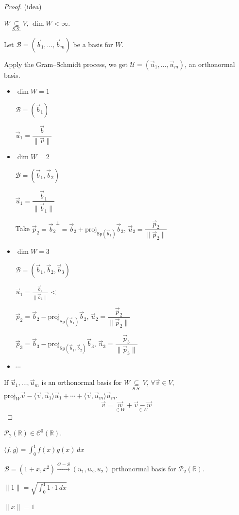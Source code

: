 \documentclass[11pt,fleqn]{book} %
\begin{document}
\begin{proof}
    (idea)

    $W \underset{S.S.}{\subseteq} V$, $\dim W < \infty$.

    Let $\mathcal{B} = (\vec{b}_1, \dots, \vec{b}_m)$ be a basis for $W$.

    Apply the Gram–Schmidt process, we get $\mathcal{U} = (\vec{u}_1, \dots, \vec{u}_m)$, an orthonormal basis.

    \begin{itemize}
        \item $\dim W = 1$

        $\mathcal{B} = (\vec{b}_1)$

        $\vec{u}_1 = \dfrac{\vec{b}}{\|\vec{v}\|}$

        \item $\dim W =2$

        $\mathcal{B} = (\vec{b}_1, \vec{b}_2)$

        $\vec{u}_1 = \dfrac{\vec{b}_1}{\|\vec{b}_1\|}$

        Take $\vec{p}_2 = {\vec{b}_2}^\perp = \vec{b}_2 + \mathrm{proj}_{\mathrm{Sp}(\vec{b}_1)}\vec{b}_2$, $\vec{u}_2 = \dfrac{\vec{p}_2}{\|\vec{p}_2\|}$

        \item $\dim W = 3$

        $\mathcal{B} = (\vec{b}_1, \vec{b}_2, \vec{b}_3)$

        $\vec{u}_1 = \frac{\vec{b}_1}{\|\vec{b}_1\|}$ <

        $\vec{p}_2 = \vec{b}_2 - \mathrm{proj}_{\mathrm{Sp}(\vec{b}_1)}\vec{b}_2$, $\vec{u}_2 = \dfrac{\vec{p}_2}{\|\vec{p}_2\|}$

        $\vec{p}_3 = \vec{b}_3 - \mathrm{proj}_{\mathrm{Sp}(\vec{b}_1, \vec{b}_2)}\vec{b}_3$, $\vec{u}_3 = \dfrac{\vec{p}_3}{\|\vec{p}_3\|}$

        \item $\cdots$
    \end{itemize}

    If $\vec{u}_1, \dots, \vec{u}_m$ is an orthonormal basis for $W \underset{S.S.}{\subseteq} V$, $\forall \vec{v} \in V$, $\mathrm{proj}_W\vec{v} - \langle \vec{v}, \vec{u}_1 \rangle\vec{u}_1 + \cdots + \langle \vec{v}, \vec{u}_m \rangle\vec{u}_m$.
    $$\vec{v} = \underset{\in W}{\vec{w}} + \underset{\in W}{\vec{v} - \vec{w}}$$
\end{proof}

\begin{example}
    $\mathcal{P}_2(\mathbb{R}) \in \mathcal{C}^0(\mathbb{R})$.

    $\langle f, g \rangle = \int_0^1 f(x)g(x)\,dx$

    $\mathcal{B} = (1 + x, x^2) \overset{G-S}{\longrightarrow} (u_1, u_2, u_2)$ prthonormal basis for $\mathcal{P}_2(\mathbb{R})$.

    $\|1\| = \sqrt{\int_0^1 1\cdot1\,dx}$

    $\|x\| = 1$
\end{example}
\end{document}
